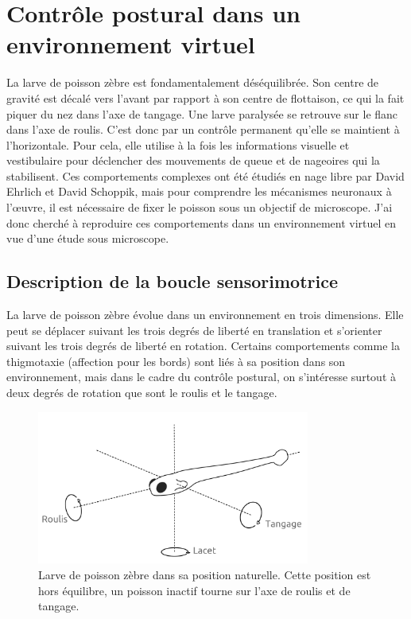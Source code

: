 \chapter{Contrôle postural dans un environnement virtuel}\label{chapII}

La larve de poisson zèbre est fondamentalement déséquilibrée. Son centre de gravité est décalé vers l'avant par rapport à son centre de flottaison, ce qui la fait piquer du nez dans l'axe de tangage. Une larve paralysée se retrouve sur le flanc dans l'axe de roulis. C'est donc par un contrôle permanent qu'elle se maintient à l'horizontale. Pour cela, elle utilise à la fois les informations visuelle et vestibulaire pour déclencher des mouvements de queue et de nageoires qui la stabilisent. Ces comportements complexes ont été étudiés en nage libre par David Ehrlich et David Schoppik, mais pour comprendre les mécanismes neuronaux à l'œuvre, il est nécessaire de fixer le poisson sous un objectif de microscope. J'ai donc cherché à reproduire ces comportements dans un environnement virtuel en vue d'une étude sous microscope.

\section{Description de la boucle sensorimotrice}

La larve de poisson zèbre évolue dans un environnement en trois dimensions. Elle peut se déplacer suivant les trois degrés de liberté en translation et s'orienter suivant les trois degrés de liberté en rotation. Certains comportements comme la thigmotaxie (affection pour les bords) sont liés à sa position dans son environnement, mais dans le cadre du contrôle postural, on s'intéresse surtout à deux degrés de rotation que sont le roulis et le tangage.

\begin{figure}
\centering
\includegraphics[width=0.8\textwidth]{./files/fish.png}
\caption{Larve de poisson zèbre dans sa position naturelle. Cette position est hors équilibre, un poisson inactif tourne sur l'axe de roulis et de tangage.}
\end{figure}

